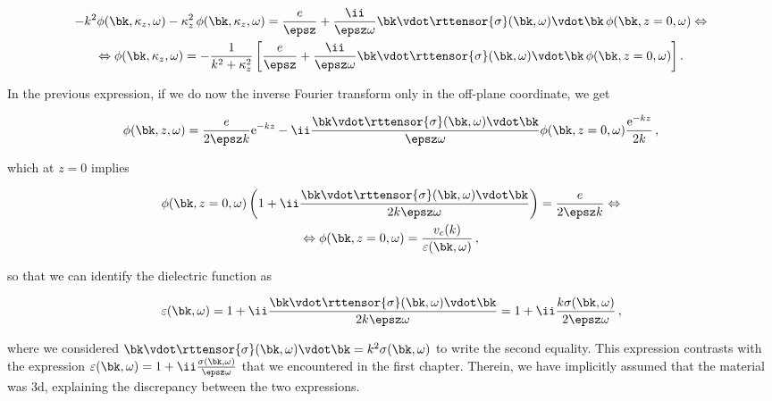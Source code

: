 \begin{equation}
    \begin{gathered}
        -k^{2}\phi(\bk,\kappa_{z},\omega)-\kappa_{z}^{2}\,\phi(\bk,\kappa_{z},\omega)=\frac{e}{\epsz}+\frac{\ii}{\epsz\omega} \bk \vdot \rttensor{\sigma}(\bk,\omega) \vdot \bk\, \phi(\bk,z=0,\omega)\Leftrightarrow\\
        \Leftrightarrow\phi(\bk,\kappa_{z},\omega)=-\frac{1}{k^{2}+\kappa_{z}^{2}}\left[\frac{e}{\epsz}+\frac{\ii}{\epsz\omega} \bk \vdot \rttensor{\sigma}(\bk,\omega) \vdot \bk\, \phi(\bk,z=0,\omega)\right].
    \end{gathered}
\end{equation}

\noindent In the previous expression, if we do now the inverse Fourier transform only in the off-plane coordinate, we get

\begin{equation}
    \phi(\bk,z,\omega)=\frac{e}{2\epsz k}\mathrm{e}^{-kz}-\ii\frac{\bk \vdot \rttensor{\sigma}(\bk,\omega) \vdot \bk}{\epsz\omega}\phi(\bk,z=0,\omega)\frac{\mathrm{e}^{-kz}}{2k}\,,
\end{equation}

\noindent which at $z=0$ implies

\begin{equation}
    \begin{gathered}
        \phi(\bk,z=0,\omega)\left(1+\ii\frac{\bk \vdot \rttensor{\sigma}(\bk,\omega) \vdot \bk}{2 k \epsz\omega}\right)=\frac{e}{2 \epsz k}\Leftrightarrow\\
        \Leftrightarrow \phi(\bk,z=0,\omega)=\frac{v_{c}(k)}{\varepsilon(\bk,\omega)}\,,
    \end{gathered}
\end{equation}

\noindent so that we can identify the dielectric function as

\begin{equation}
    \varepsilon(\bk,\omega)=1+\ii\frac{\bk \vdot \rttensor{\sigma}(\bk,\omega) \vdot \bk}{2k\epsz\omega}=1+\ii\frac{k \sigma(\bk,\omega)}{2\epsz\omega}\,,
\end{equation}

\noindent where we considered $\bk \vdot \rttensor{\sigma}(\bk,\omega) \vdot \bk = k^2 \sigma(\bk,\omega)$ to write the second equality.
This expression contrasts with the expression $\varepsilon(\bk,\omega)=1+\ii \frac{\sigma(\bk,\omega)}{\epsz \omega}$ that we encountered in the first chapter.
Therein, we have implicitly assumed that the material was \gls{3d}, explaining the discrepancy between the two expressions.
